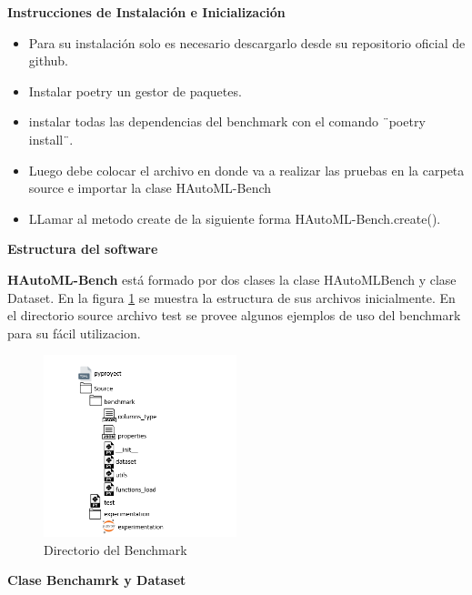 \begin{flushleft} 
    {\large { \textbf{ Instrucciones de Instalación e Inicialización}}}\label{section:instructions}
\end{flushleft}

 
\begin{itemize}
    \item Para su instalación solo es necesario descargarlo desde su repositorio oficial de github. 
    \item Instalar poetry un gestor de paquetes.   
    \item instalar todas las dependencias del benchmark con el comando ¨poetry install¨.
    \item Luego debe colocar el archivo en donde va a realizar las pruebas en la carpeta source e importar la clase HAutoML-Bench
    \item LLamar al metodo create de la siguiente forma HAutoML-Bench.create(). 
\end{itemize}
\begin{flushleft} 
    {\large { \textbf{Estructura del software}}}\label{section:struct}
\end{flushleft}


\textbf{HAutoML-Bench} está formado por dos clases la clase HAutoMLBench y clase Dataset. En la figura \ref{fig:image1} se muestra la estructura de sus archivos inicialmente.
En el directorio source archivo test se provee algunos ejemplos de uso del benchmark para su fácil utilizacion.

\begin{figure}[H]
    \centering
    \includegraphics[width=0.5\textwidth]{Graphics/directory.png}
    \caption{Directorio del Benchmark}
    \label{fig:image1}
 \end{figure}

\begin{flushleft} 
    {\large { \textbf{ Clase Benchamrk y Dataset}}}\label{section:class}
\end{flushleft}

